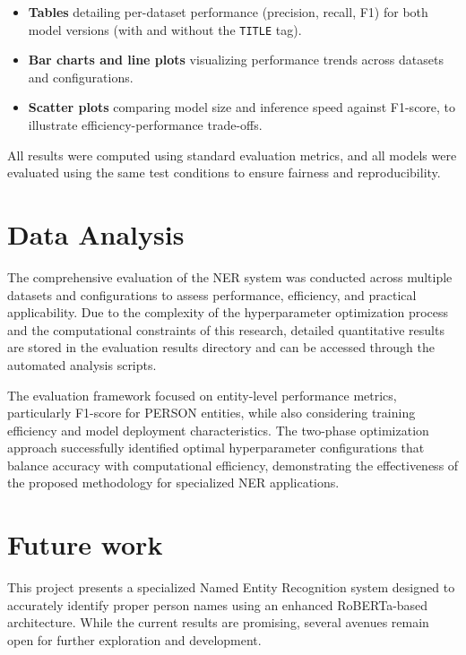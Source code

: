 \documentclass[a4paper]{usiinfbachelorproject}
\begin{document}
\begin{itemize}
  \item \textbf{Tables} detailing per-dataset performance (precision, recall, F1) for both model versions (with and without the \texttt{TITLE} tag).
  \item \textbf{Bar charts and line plots} visualizing performance trends across datasets and configurations.
  \item \textbf{Scatter plots} comparing model size and inference speed against F1-score, to illustrate efficiency-performance trade-offs.
\end{itemize}

All results were computed using standard evaluation metrics, and all models were evaluated using the same test conditions to ensure fairness and reproducibility.  
\\


\section{Data Analysis}

The comprehensive evaluation of the NER system was conducted across multiple datasets and configurations to assess performance, efficiency, and practical applicability. Due to the complexity of the hyperparameter optimization process and the computational constraints of this research, detailed quantitative results are stored in the evaluation results directory and can be accessed through the automated analysis scripts.

The evaluation framework focused on entity-level performance metrics, particularly F1-score for PERSON entities, while also considering training efficiency and model deployment characteristics. The two-phase optimization approach successfully identified optimal hyperparameter configurations that balance accuracy with computational efficiency, demonstrating the effectiveness of the proposed methodology for specialized NER applications.



		
\newpage
\section{\textbf{Future work}}

This project presents a specialized Named Entity Recognition system designed to accurately identify proper person names using an enhanced RoBERTa-based architecture. While the current results are promising, several avenues remain open for further exploration and development.
\end{document}
